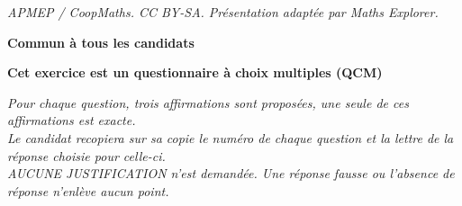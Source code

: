 \documentclass[10pt]{article}
\begin{document}
\noindent\textit{APMEP / CoopMaths. CC BY-SA. Présentation adaptée par Maths Explorer.}\par\medskip
\textbf{Commun à tous les candidats}

\medskip

\textbf{Cet exercice est un questionnaire à choix multiples (QCM)}

\medskip


\emph{Pour chaque question, trois affirmations sont proposées, une seule de ces affirmations est exacte.\\
Le candidat recopiera sur sa copie le numéro de chaque question et la lettre de la réponse choisie pour celle-ci.\\
 AUCUNE JUSTIFICATION n'est demandée. Une réponse fausse ou l'absence de réponse n'enlève aucun point.}

\medskip
\end{document}
